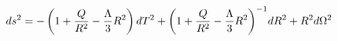 \begin{equation}
d{s^2}=-\left(1+{Q\over{R^2}}-{\Lambda\over{3}}{R^2}\right)d{T^2}+
{{\left(1+{Q\over{R^2}}-{\Lambda\over{3}}{R^2}\right)}^{-1}}d{R^2}+
{R^2}d{\Omega^2}
\end{equation}


